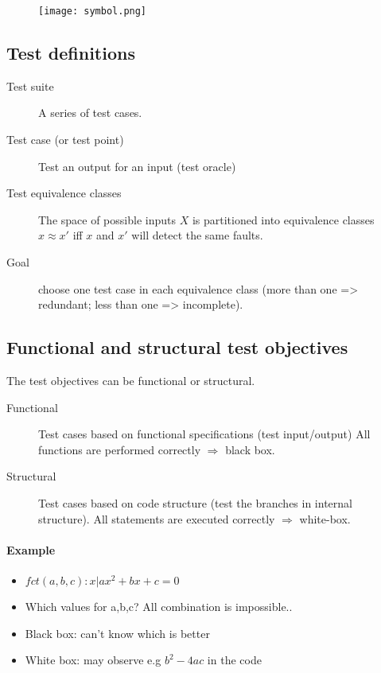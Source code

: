 \begin{figure}[!ht]
    \centering
    \texttt{[image: symbol.png]}
\end{figure}


\subsection{Test definitions}

\begin{description}
    \item[Test suite] A series of test cases.
    \item[Test case (or test point)] Test an output for an input (test oracle)
    \item[Test equivalence classes] The space of possible inputs $X$ is partitioned into equivalence classes $x \approx x'$ iff $x$ and $x'$ will detect the same faults.
    \item[Goal] choose one test case in each equivalence class (more than one => redundant; less than one => incomplete).
\end{description}

\subsection{Functional and structural test objectives}
The test objectives can be functional or structural. 

\begin{description}
    \item[Functional] Test cases based on functional specifications
        (test input/output)
        \subitem{} All functions are performed correctly $\Rightarrow$ black box.
    \item[Structural] Test cases based on code structure (test the
        branches in internal structure).
        \subitem{} All statements are executed correctly $\Rightarrow$ white-box.
\end{description}

\paragraph{Example}

\begin{itemize}
\item $fct(a,b,c): {x | ax^2 + bx + c = 0}$
    \item Which values for a,b,c? All combination is impossible..

    \item Black box: can't know which is better
        \item White box: may observe e.g $b^2 - 4ac$ in the code
    \end{itemize}



